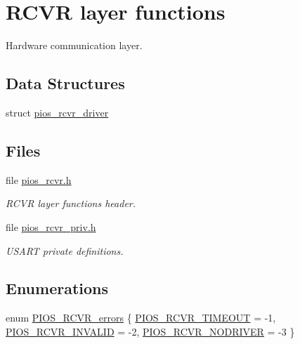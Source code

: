 \hypertarget{group___p_i_o_s___r_c_v_r}{\section{\-R\-C\-V\-R layer functions}
\label{group___p_i_o_s___r_c_v_r}
}


\-Hardware communication layer.  


\subsection*{\-Data \-Structures}
\begin{DoxyCompactItemize}
\item 
struct \hyperlink{structpios__rcvr__driver}{pios\-\_\-rcvr\-\_\-driver}
\end{DoxyCompactItemize}
\subsection*{\-Files}
\begin{DoxyCompactItemize}
\item 
file \hyperlink{pios__rcvr_8h}{pios\-\_\-rcvr.\-h}
\begin{DoxyCompactList}\small\item\em \-R\-C\-V\-R layer functions header. \end{DoxyCompactList}\item 
file \hyperlink{pios__rcvr__priv_8h}{pios\-\_\-rcvr\-\_\-priv.\-h}
\begin{DoxyCompactList}\small\item\em \-U\-S\-A\-R\-T private definitions. \end{DoxyCompactList}\end{DoxyCompactItemize}
\subsection*{\-Enumerations}
\begin{DoxyCompactItemize}
\item 
enum \hyperlink{group___p_i_o_s___r_c_v_r_gab3256a57f692c2f2784d914ad5a5895d}{\-P\-I\-O\-S\-\_\-\-R\-C\-V\-R\-\_\-errors} \{ \hyperlink{group___p_i_o_s___r_c_v_r_ggab3256a57f692c2f2784d914ad5a5895da2aa8c41419029589d123f942ceb9a0ed}{\-P\-I\-O\-S\-\_\-\-R\-C\-V\-R\-\_\-\-T\-I\-M\-E\-O\-U\-T} =  -\/1, 
\hyperlink{group___p_i_o_s___r_c_v_r_ggab3256a57f692c2f2784d914ad5a5895da3ed95ffc05faba3edae14cc920cad3cb}{\-P\-I\-O\-S\-\_\-\-R\-C\-V\-R\-\_\-\-I\-N\-V\-A\-L\-I\-D} =  -\/2, 
\hyperlink{group___p_i_o_s___r_c_v_r_ggab3256a57f692c2f2784d914ad5a5895da8408e57d6177365df6cce65e8692880a}{\-P\-I\-O\-S\-\_\-\-R\-C\-V\-R\-\_\-\-N\-O\-D\-R\-I\-V\-E\-R} =  -\/3
 \}
\end{DoxyCompactItemize}

